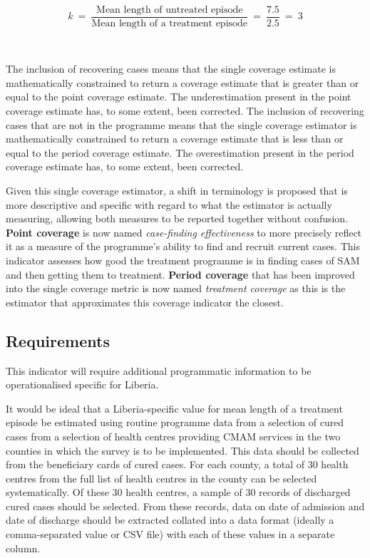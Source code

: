 \documentclass[12pt,a4paper]{book}
\theoremstyle{definition}
\theoremstyle{definition}
\theoremstyle{definition}
\theoremstyle{remark}
\begin{document}
~

\[ k ~ = ~ \frac{\text{Mean length of untreated episode}}{\text{Mean length of a treatment episode}} ~ = ~ \frac{7.5}{2.5} ~ = ~ 3 \]

~

The inclusion of recovering cases means that the single coverage
estimate is mathematically constrained to return a coverage estimate
that is greater than or equal to the point coverage estimate. The
underestimation present in the point coverage estimate has, to some
extent, been corrected. The inclusion of recovering cases that are not
in the programme means that the single coverage estimator is
mathematically constrained to return a coverage estimate that is less
than or equal to the period coverage estimate. The overestimation
present in the period coverage estimate has, to some extent, been
corrected.

Given this single coverage estimator, a shift in terminology is proposed
that is more descriptive and specific with regard to what the estimator
is actually measuring, allowing both measures to be reported together
without confusion. \textbf{Point coverage} is now named
\emph{case-finding effectiveness} to more precisely reflect it as a
measure of the programme's ability to find and recruit current cases.
This indicator assesses how good the treatment programme is in finding
cases of SAM and then getting them to treatment. \textbf{Period
coverage} that has been improved into the single coverage metric is now
named \emph{treatment coverage} as this is the estimator that
approximates this coverage indicator the closest.

\hypertarget{requirements}{%
\subsection{Requirements}\label{requirements}}

This indicator will require additional programmatic information to be
operationalised specific for Liberia.

It would be ideal that a Liberia-specific value for mean length of a
treatment episode be estimated using routine programme data from a
selection of cured cases from a selection of health centres providing
CMAM services in the two counties in which the survey is to be
implemented. This data should be collected from the beneficiary cards of
cured cases. For each county, a total of 30 health centres from the full
list of health centres in the county can be selected systematically. Of
these 30 health centres, a sample of 30 records of discharged cured
cases should be selected. From these records, data on date of admission
and date of discharge should be extracted collated into a data format
(ideally a comma-separated value or CSV file) with each of these values
in a separate column.
\end{document}
